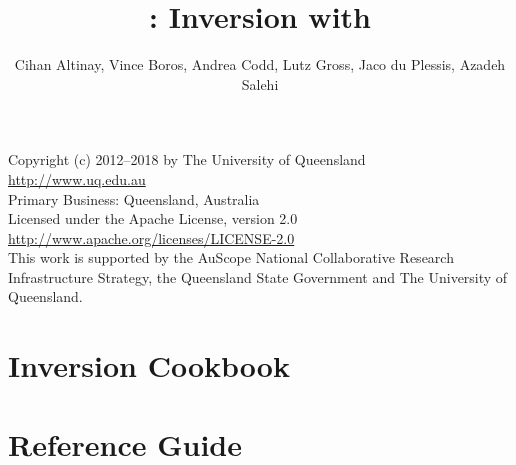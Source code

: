 \documentclass{esysdoc}
\begin{document}

\title{\downunder: Inversion with \escript}
\author{Cihan Altinay, Vince Boros, Andrea Codd, Lutz Gross, Jaco du Plessis, Azadeh Salehi}
\release{\relver}

\maketitle

\begin{center}
Copyright (c) 2012--2018 by The University of Queensland	\\
\url{http://www.uq.edu.au}				\\
Primary Business: Queensland, Australia			\\
Licensed under the Apache License, version 2.0	\\
\url{http://www.apache.org/licenses/LICENSE-2.0}	\\

This work is supported by the AuScope National Collaborative Research Infrastructure Strategy, 
the Queensland State Government and The University of Queensland.

\end{center}



\cleardoublepage{}%
\tableofcontents %
\cleardoublepage %

\pagestyle{fancy}



\part{Inversion Cookbook}\label{part1}





\part{Reference Guide}\label{part2}









\esysappendix
{}
%


\cleardoublepage
{}
{}
\printindex


\cleardoublepage{}
{}

\end{document}
